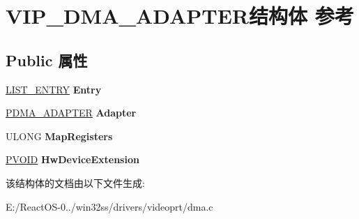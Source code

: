 \hypertarget{struct_v_i_p___d_m_a___a_d_a_p_t_e_r}{}\section{V\+I\+P\+\_\+\+D\+M\+A\+\_\+\+A\+D\+A\+P\+T\+E\+R结构体 参考}
\label{struct_v_i_p___d_m_a___a_d_a_p_t_e_r}
\subsection*{Public 属性}
\begin{DoxyCompactItemize}
\item 
\mbox{\label{struct_v_i_p___d_m_a___a_d_a_p_t_e_r_a17f3ab0ff38aede11b4d654b75b2d7f0}} 
\hyperlink{struct___l_i_s_t___e_n_t_r_y}{L\+I\+S\+T\+\_\+\+E\+N\+T\+RY} {\bfseries Entry}
\item 
\mbox{\label{struct_v_i_p___d_m_a___a_d_a_p_t_e_r_a365ee16a153a6d11732b3a3dcf7b8003}} 
\hyperlink{struct___d_m_a___a_d_a_p_t_e_r}{P\+D\+M\+A\+\_\+\+A\+D\+A\+P\+T\+ER} {\bfseries Adapter}
\item 
\mbox{\label{struct_v_i_p___d_m_a___a_d_a_p_t_e_r_aab649e02c234cc20a5baaf545a721021}} 
U\+L\+O\+NG {\bfseries Map\+Registers}
\item 
\mbox{\label{struct_v_i_p___d_m_a___a_d_a_p_t_e_r_a71fa3f37d21ebc813beee55ea1ea5c6b}} 
\hyperlink{interfacevoid}{P\+V\+O\+ID} {\bfseries Hw\+Device\+Extension}
\end{DoxyCompactItemize}


该结构体的文档由以下文件生成\+:\begin{DoxyCompactItemize}
\item 
E\+:/\+React\+O\+S-\/0../win32ss/drivers/videoprt/dma.\+c\end{DoxyCompactItemize}
